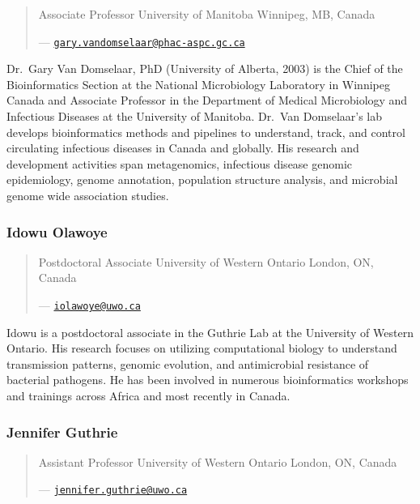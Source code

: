 \documentclass[
]{book}
\begin{document}
\begin{quote}
Associate Professor
University of Manitoba
Winnipeg, MB, Canada

--- \href{mailto:gary.vandomselaar@phac-aspc.gc.ca}{\nolinkurl{gary.vandomselaar@phac-aspc.gc.ca}}
\end{quote}

Dr.~Gary Van Domselaar, PhD (University of Alberta, 2003) is the Chief of the Bioinformatics Section at the National Microbiology Laboratory in Winnipeg Canada and Associate Professor in the Department of Medical Microbiology and Infectious Diseases at the University of Manitoba. Dr.~Van Domselaar's lab develops bioinformatics methods and pipelines to understand, track, and control circulating infectious diseases in Canada and globally. His research and development activities span metagenomics, infectious disease genomic epidemiology, genome annotation, population structure analysis, and microbial genome wide association studies.

\subsubsection{Idowu Olawoye}\label{idowu-olawoye}

\begin{quote}
Postdoctoral Associate
University of Western Ontario
London, ON, Canada

--- \href{mailto:iolawoye@uwo.ca}{\nolinkurl{iolawoye@uwo.ca}}
\end{quote}

Idowu is a postdoctoral associate in the Guthrie Lab at the University of Western Ontario. His research focuses on utilizing computational biology to understand transmission patterns, genomic evolution, and antimicrobial resistance of bacterial pathogens. He has been involved in numerous bioinformatics workshops and trainings across Africa and most recently in Canada.

\subsubsection{Jennifer Guthrie}\label{jennifer-guthrie}

\begin{quote}
Assistant Professor
University of Western Ontario
London, ON, Canada

--- \href{mailto:jennifer.guthrie@uwo.ca}{\nolinkurl{jennifer.guthrie@uwo.ca}}
\end{quote}
\end{document}
